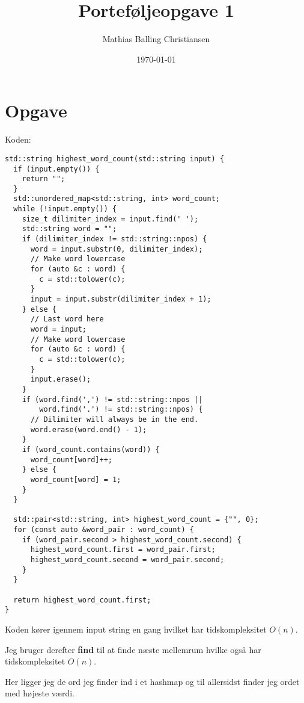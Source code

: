 \documentclass{article}
\title{Porteføljeopgave 1}
\author{Mathias Balling Christiansen}
\date{\today}
\begin{document}
\maketitle
\tableofcontents
\newpage

\section{Opgave} %
Koden:
\begin{verbatim}
std::string highest_word_count(std::string input) {
  if (input.empty()) {
    return "";
  }
  std::unordered_map<std::string, int> word_count;
  while (!input.empty()) {
    size_t dilimiter_index = input.find(' ');
    std::string word = "";
    if (dilimiter_index != std::string::npos) {
      word = input.substr(0, dilimiter_index);
      // Make word lowercase
      for (auto &c : word) {
        c = std::tolower(c);
      }
      input = input.substr(dilimiter_index + 1);
    } else {
      // Last word here
      word = input;
      // Make word lowercase
      for (auto &c : word) {
        c = std::tolower(c);
      }
      input.erase();
    }
    if (word.find(',') != std::string::npos ||
        word.find('.') != std::string::npos) {
      // Dilimiter will always be in the end.
      word.erase(word.end() - 1);
    }
    if (word_count.contains(word)) {
      word_count[word]++;
    } else {
      word_count[word] = 1;
    }
  }

  std::pair<std::string, int> highest_word_count = {"", 0};
  for (const auto &word_pair : word_count) {
    if (word_pair.second > highest_word_count.second) {
      highest_word_count.first = word_pair.first;
      highest_word_count.second = word_pair.second;
    }
  }

  return highest_word_count.first;
}
\end{verbatim}

Koden kører igennem input string en gang hvilket har tidskompleksitet $O(n)$.

Jeg bruger derefter \textbf{find} til at finde næste mellemrum hvilke også har 
tidskompleksitet $O(n)$.

Her ligger jeg de ord jeg finder ind i et hashmap og til allersidst finder jeg ordet med højeste værdi.
\end{document}
